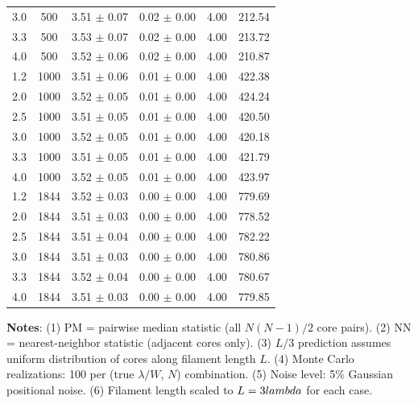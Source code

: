 \begin{table}
\begin{tabular}{lccccc}
3.0 &  500 & 3.51 $\pm$ 0.07 & 0.02 $\pm$ 0.00 & 4.00 & 212.54 \\
3.3 &  500 & 3.53 $\pm$ 0.07 & 0.02 $\pm$ 0.00 & 4.00 & 213.72 \\
4.0 &  500 & 3.52 $\pm$ 0.06 & 0.02 $\pm$ 0.00 & 4.00 & 210.87 \\
1.2 & 1000 & 3.51 $\pm$ 0.06 & 0.01 $\pm$ 0.00 & 4.00 & 422.38 \\
2.0 & 1000 & 3.52 $\pm$ 0.05 & 0.01 $\pm$ 0.00 & 4.00 & 424.24 \\
2.5 & 1000 & 3.51 $\pm$ 0.05 & 0.01 $\pm$ 0.00 & 4.00 & 420.50 \\
3.0 & 1000 & 3.52 $\pm$ 0.05 & 0.01 $\pm$ 0.00 & 4.00 & 420.18 \\
3.3 & 1000 & 3.51 $\pm$ 0.05 & 0.01 $\pm$ 0.00 & 4.00 & 421.79 \\
4.0 & 1000 & 3.52 $\pm$ 0.05 & 0.01 $\pm$ 0.00 & 4.00 & 423.97 \\
1.2 & 1844 & 3.52 $\pm$ 0.03 & 0.00 $\pm$ 0.00 & 4.00 & 779.69 \\
2.0 & 1844 & 3.51 $\pm$ 0.03 & 0.00 $\pm$ 0.00 & 4.00 & 778.52 \\
2.5 & 1844 & 3.51 $\pm$ 0.04 & 0.00 $\pm$ 0.00 & 4.00 & 782.22 \\
3.0 & 1844 & 3.51 $\pm$ 0.03 & 0.00 $\pm$ 0.00 & 4.00 & 780.86 \\
3.3 & 1844 & 3.52 $\pm$ 0.04 & 0.00 $\pm$ 0.00 & 4.00 & 780.67 \\
4.0 & 1844 & 3.51 $\pm$ 0.03 & 0.00 $\pm$ 0.00 & 4.00 & 779.85 \\

\bottomrule
\end{tabular}

\vspace{0.1in}
\footnotesize
\textbf{Notes}: (1) PM = pairwise median statistic (all $N(N-1)/2$ core pairs).
(2) NN = nearest-neighbor statistic (adjacent cores only).
(3) $L/3$ prediction assumes uniform distribution of cores along filament length $L$.
(4) Monte Carlo realizations: 100 per (true $\lambda/W$, $N$) combination.
(5) Noise level: 5\% Gaussian positional noise.
(6) Filament length scaled to $L = 3\\lambda$ for each case.
\end{table}
